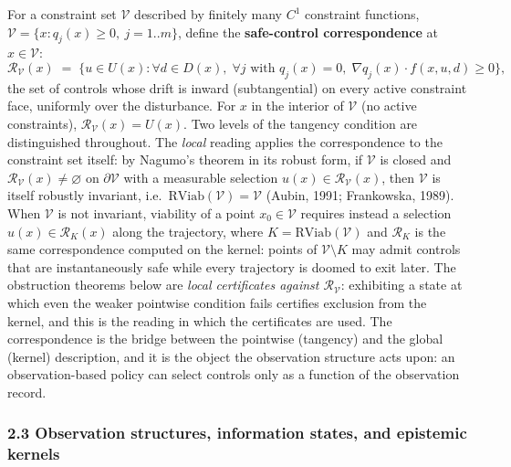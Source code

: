 \documentclass[11pt]{article}
\begin{document}
For a constraint set \(\mathcal{V}\) described by finitely many \(C^1\)
constraint functions,
\(\mathcal{V} = \{ x : q_j(x) \ge 0,\ j = 1..m \}\), define the
\textbf{safe-control correspondence} at \(x \in \mathcal{V}\):
\[\mathcal{R}_{\mathcal{V}}(x) \;=\; \Big\{ u \in U(x) : \forall d \in D(x),\; \forall j \text{ with } q_j(x) = 0,\; \nabla q_j(x) \cdot f(x, u, d) \ge 0 \Big\},\]
the set of controls whose drift is inward (subtangential) on every
active constraint face, uniformly over the disturbance. For \(x\) in the
interior of \(\mathcal{V}\) (no active constraints),
\(\mathcal{R}_{\mathcal{V}}(x) = U(x)\). Two levels of the tangency
condition are distinguished throughout. The \emph{local} reading applies
the correspondence to the constraint set itself: by Nagumo's theorem in
its robust form, if \(\mathcal{V}\) is closed and
\(\mathcal{R}_{\mathcal{V}}(x) \neq \varnothing\) on
\(\partial\mathcal{V}\) with a measurable selection
\(u(x) \in \mathcal{R}_{\mathcal{V}}(x)\), then \(\mathcal{V}\) is
itself robustly invariant,
i.e.~\(\mathrm{RViab}(\mathcal{V}) = \mathcal{V}\) (Aubin, 1991;
Frankowska, 1989). When \(\mathcal{V}\) is not invariant, viability of a
point \(x_0 \in \mathcal{V}\) requires instead a selection
\(u(x) \in \mathcal{R}_K(x)\) along the trajectory, where
\(K = \mathrm{RViab}(\mathcal{V})\) and \(\mathcal{R}_K\) is the same
correspondence computed on the kernel: points of
\(\mathcal{V} \setminus K\) may admit controls that are instantaneously
safe while every trajectory is doomed to exit later. The obstruction
theorems below are \emph{local certificates against
\(\mathcal{R}_{\mathcal{V}}\)}: exhibiting a state at which even the
weaker pointwise condition fails certifies exclusion from the kernel,
and this is the reading in which the certificates are used. The
correspondence is the bridge between the pointwise (tangency) and the
global (kernel) description, and it is the object the observation
structure acts upon: an observation-based policy can select controls
only as a function of the observation record.

\subsubsection{2.3 Observation structures, information states, and
epistemic
kernels}\label{observation-structures-information-states-and-epistemic-kernels}
\end{document}
